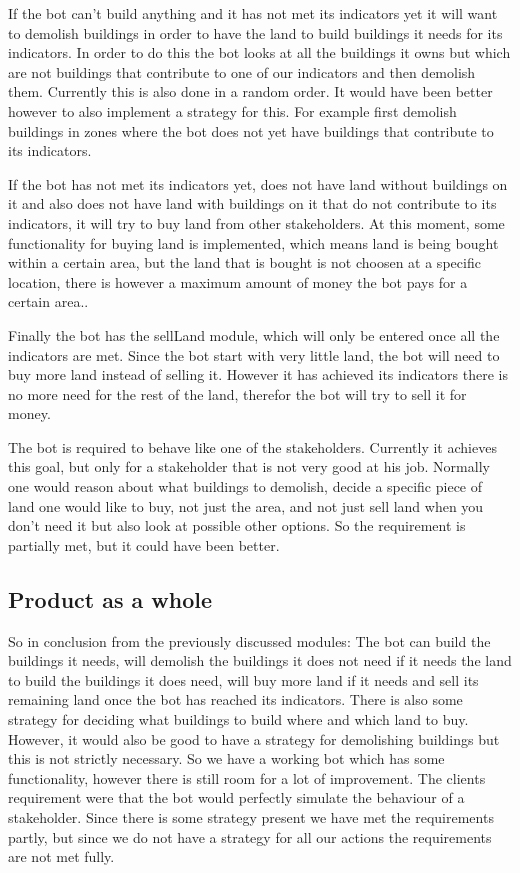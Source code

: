 If the bot can't build anything and it has not met its indicators yet it will want to demolish buildings in order to have the land to build buildings it needs for its indicators. In order to do this the bot looks at all the buildings it owns but which are not buildings that contribute to one of our indicators and then demolish them. Currently this is also done in a random order. It would have been better however to also implement a strategy for this. For example first demolish buildings in zones where the bot does not yet have buildings that contribute to its indicators. 

If the bot has not met its indicators yet, does not have land without buildings on it and also does not have land with buildings on it that do not contribute to its indicators, it will try to buy land from other stakeholders. At this moment, some functionality for buying land is implemented, which means land is being bought within a certain area, but the land that is bought is not choosen at a specific location, there is however a maximum amount of money the bot pays for a certain area..

Finally the bot has the sellLand module, which will only be entered once all the indicators are met. Since the bot start with very little land, the bot will need to buy more land instead of selling it. However it has achieved its indicators there is no more need for the rest of the land, therefor the bot will try to sell it for money.

The bot is required to behave like one of the stakeholders. Currently it achieves this goal, but only for a stakeholder that is not very good at his job. Normally one would reason about what buildings to demolish, decide a specific piece of land one would like to buy, not just the area, and not just sell land when you don't need it but also look at possible other options. So the requirement is partially met, but it could have been better.

\subsection{Product as a whole}
So in conclusion from the previously discussed modules: The bot can build the buildings it needs, will demolish the buildings it does not need if it needs the land to build the buildings it does need, will buy more land if it needs and sell its remaining land once the bot has reached its indicators. There is also some strategy for deciding what buildings to build where and which land to buy. However, it would also be good to have a strategy for demolishing buildings but this is not strictly necessary. So we have a working bot which has some functionality, however there is still room for a lot of improvement. The clients requirement were that the bot would perfectly simulate the behaviour of a stakeholder. Since there is some strategy present we have met the requirements partly, but since we do not have a strategy for all our actions the requirements are not met fully. 

